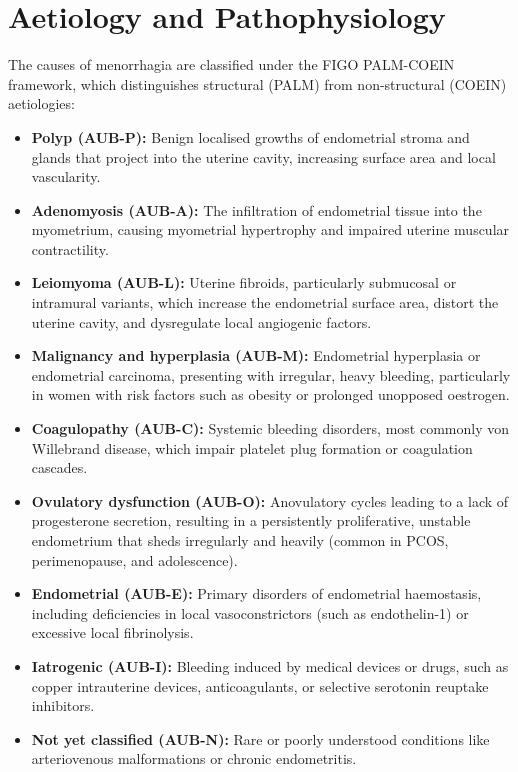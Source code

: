 \section*{Aetiology and Pathophysiology}
The causes of menorrhagia are classified under the FIGO PALM-COEIN framework, which distinguishes structural (PALM) from non-structural (COEIN) aetiologies:
\begin{itemize}
    \item \textbf{Polyp (AUB-P):} Benign localised growths of endometrial stroma and glands that project into the uterine cavity, increasing surface area and local vascularity.
    \item \textbf{Adenomyosis (AUB-A):} The infiltration of endometrial tissue into the myometrium, causing myometrial hypertrophy and impaired uterine muscular contractility.
    \item \textbf{Leiomyoma (AUB-L):} Uterine fibroids, particularly submucosal or intramural variants, which increase the endometrial surface area, distort the uterine cavity, and dysregulate local angiogenic factors.
    \item \textbf{Malignancy and hyperplasia (AUB-M):} Endometrial hyperplasia or endometrial carcinoma, presenting with irregular, heavy bleeding, particularly in women with risk factors such as obesity or prolonged unopposed oestrogen.
    \item \textbf{Coagulopathy (AUB-C):} Systemic bleeding disorders, most commonly von Willebrand disease, which impair platelet plug formation or coagulation cascades.
    \item \textbf{Ovulatory dysfunction (AUB-O):} Anovulatory cycles leading to a lack of progesterone secretion, resulting in a persistently proliferative, unstable endometrium that sheds irregularly and heavily (common in PCOS, perimenopause, and adolescence).
    \item \textbf{Endometrial (AUB-E):} Primary disorders of endometrial haemostasis, including deficiencies in local vasoconstrictors (such as endothelin-1) or excessive local fibrinolysis.
    \item \textbf{Iatrogenic (AUB-I):} Bleeding induced by medical devices or drugs, such as copper intrauterine devices, anticoagulants, or selective serotonin reuptake inhibitors.
    \item \textbf{Not yet classified (AUB-N):} Rare or poorly understood conditions like arteriovenous malformations or chronic endometritis.
\end{itemize}

